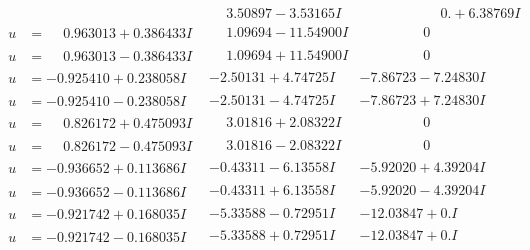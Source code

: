 \documentclass[1p]{elsarticle_modified}
\theoremstyle{definition}
\begin{document}
$$\begin{array}{c|c|c}
 & \phantom{-}3.50897 - 3.53165 I & \phantom{-0.000000 -}0. + 6.38769 I \\ \hline\begin{aligned}
u &= \phantom{-}0.963013 + 0.386433 I\end{aligned}
 & \phantom{-}1.09694 - 11.54900 I & \phantom{-0.000000 } 0 \\ \hline\begin{aligned}
u &= \phantom{-}0.963013 - 0.386433 I\end{aligned}
 & \phantom{-}1.09694 + 11.54900 I & \phantom{-0.000000 } 0 \\ \hline\begin{aligned}
u &= -0.925410 + 0.238058 I\end{aligned}
 & -2.50131 + 4.74725 I & -7.86723 - 7.24830 I \\ \hline\begin{aligned}
u &= -0.925410 - 0.238058 I\end{aligned}
 & -2.50131 - 4.74725 I & -7.86723 + 7.24830 I \\ \hline\begin{aligned}
u &= \phantom{-}0.826172 + 0.475093 I\end{aligned}
 & \phantom{-}3.01816 + 2.08322 I & \phantom{-0.000000 } 0 \\ \hline\begin{aligned}
u &= \phantom{-}0.826172 - 0.475093 I\end{aligned}
 & \phantom{-}3.01816 - 2.08322 I & \phantom{-0.000000 } 0 \\ \hline\begin{aligned}
u &= -0.936652 + 0.113686 I\end{aligned}
 & -0.43311 - 6.13558 I & -5.92020 + 4.39204 I \\ \hline\begin{aligned}
u &= -0.936652 - 0.113686 I\end{aligned}
 & -0.43311 + 6.13558 I & -5.92020 - 4.39204 I \\ \hline\begin{aligned}
u &= -0.921742 + 0.168035 I\end{aligned}
 & -5.33588 - 0.72951 I & -12.03847 + 0. I\phantom{ +0.000000I} \\ \hline\begin{aligned}
u &= -0.921742 - 0.168035 I\end{aligned}
 & -5.33588 + 0.72951 I & -12.03847 + 0. I\phantom{ +0.000000I} \\ \hline\begin{aligned}

\end{aligned}
\end{array}$$
\end{document}
